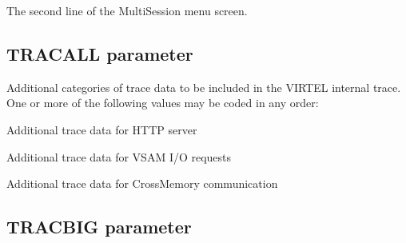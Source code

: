 \documentclass[letterpaper,10pt,english]{sphinxmanual}
\begin{document}
\sphinxAtStartPar
{} \sphinxhyphen{} The second line of the Multi\sphinxhyphen{}Session menu screen.

\ignorespaces 

\subsection{TRACALL parameter}
\label{\detokenize{Installation_Guide:tracall-parameter}}\label{\detokenize{Installation_Guide:index-127}}
\begin{sphinxVerbatim}[commandchars=\\\{\}]
 
\end{sphinxVerbatim}

\sphinxAtStartPar
{} \sphinxhyphen{} Additional categories of trace data to be included in the VIRTEL internal trace. One or more of the following values may be coded in any order:

\sphinxAtStartPar
{} \sphinxhyphen{} Additional trace data for HTTP server

\sphinxAtStartPar
{} \sphinxhyphen{} Additional trace data for VSAM I/O requests

\sphinxAtStartPar
{} \sphinxhyphen{} Additional trace data for Cross\sphinxhyphen{}Memory communication

\ignorespaces 

\subsection{TRACBIG parameter}
\label{\detokenize{Installation_Guide:tracbig-parameter}}\label{\detokenize{Installation_Guide:index-128}}
\begin{sphinxVerbatim}[commandchars=\\\{\}]
 
\end{sphinxVerbatim}
\end{document}
